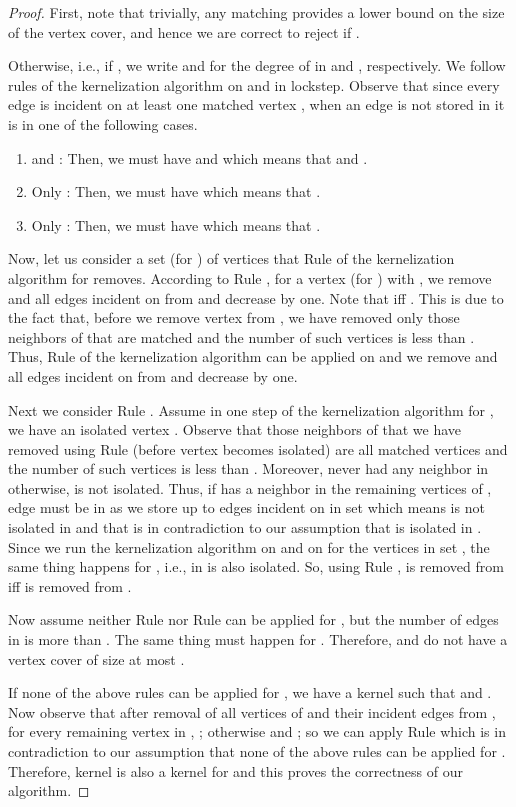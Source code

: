 \documentclass[11pt,letter]{article}
\begin{document}
\begin{proof}
First, note that trivially, any matching provides a lower bound on the
size of the vertex cover, and hence we are correct to reject if
.


Otherwise, i.e., if , we write  and  for the degree of 
in  and , respectively. We follow rules of the kernelization algorithm
on  and  in lockstep. Observe that since every edge  is incident
on at least one matched vertex , when an edge
 is not stored in  it is in one of the following
cases.
\begin{enumerate}
\item  and :
Then, we must have  and  which means that  and .
\item Only :
Then, we must have  which means that .
\item Only :
Then, we must have  which means that .
\end{enumerate}



Now, let us consider a set  (for ) of vertices
that Rule  of the kernelization algorithm for  removes. According to Rule
, for a vertex  (for ) with , we
remove  and all edges incident on  from  and decrease  by one.
Note that  iff . This is due to the fact that,
before we remove vertex  from ,
we have removed only  those neighbors of  that are matched and the number of
such vertices is less than . Thus, Rule  of the kernelization algorithm can be applied
on  and we remove  and all edges
incident on  from  and decrease  by one.




Next we consider Rule . Assume in one step of the kernelization algorithm for ,
we have an isolated vertex . Observe that those neighbors of  that we
have removed using Rule  (before vertex  becomes isolated) are all matched vertices
and the number of such vertices is less than .
Moreover,  never had any neighbor in  otherwise,  is not isolated.
Thus, if  has a neighbor  in the remaining vertices of ,
edge  must be in  as we store up to  edges incident on  in
set  which means  is not isolated in  and that is in contradiction
to our assumption that  is isolated in .
Since we run the kernelization algorithm on  and
on  for the vertices in set , the same thing happens for , i.e.,
 in  is also isolated. So, using Rule ,  is removed from
 iff  is removed from .




 Now assume neither Rule  nor Rule  can be applied for ,
 but the number of edges in  is more than . The same thing must
 happen for . Therefore,  and  do not have a vertex cover of size
 at most .

If none of the above rules can be applied for , we have a kernel 
such that  and . Now observe that after removal
of all vertices of  and their incident edges from , for every remaining vertex 
in , ; otherwise  and ; so we can apply Rule  which is
in contradiction to our assumption that none of the above rules can be applied for .
Therefore,  kernel  is also a kernel for  and this proves the correctness
of our algorithm.
\end{proof}
\end{document}
